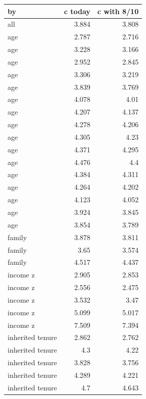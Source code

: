 \begin{tabular}{lrr}
\toprule
by & c today & c with 8/10 \\
\midrule
all & 3.884 & 3.808 \\
age & 2.787 & 2.716 \\
age & 3.228 & 3.166 \\
age & 2.952 & 2.845 \\
age & 3.306 & 3.219 \\
age & 3.839 & 3.769 \\
age & 4.078 & 4.01 \\
age & 4.207 & 4.137 \\
age & 4.278 & 4.206 \\
age & 4.305 & 4.23 \\
age & 4.371 & 4.295 \\
age & 4.476 & 4.4 \\
age & 4.384 & 4.311 \\
age & 4.264 & 4.202 \\
age & 4.123 & 4.052 \\
age & 3.924 & 3.845 \\
age & 3.854 & 3.789 \\
family & 3.878 & 3.811 \\
family & 3.65 & 3.574 \\
family & 4.517 & 4.437 \\
income z & 2.905 & 2.853 \\
income z & 2.556 & 2.475 \\
income z & 3.532 & 3.47 \\
income z & 5.099 & 5.017 \\
income z & 7.509 & 7.394 \\
inherited tenure & 2.862 & 2.762 \\
inherited tenure & 4.3 & 4.22 \\
inherited tenure & 3.828 & 3.756 \\
inherited tenure & 4.289 & 4.221 \\
inherited tenure & 4.7 & 4.643 \\
\bottomrule
\end{tabular}
